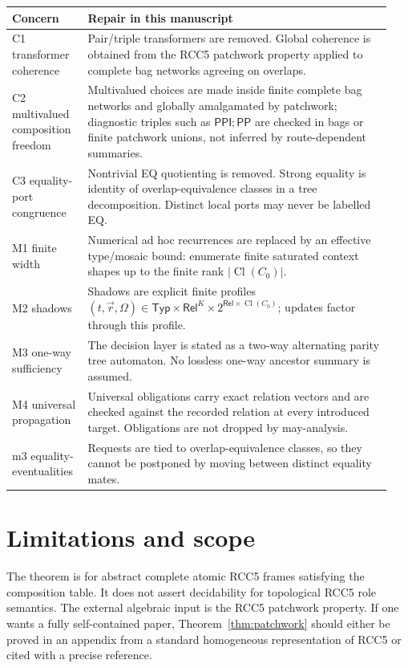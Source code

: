 \documentclass[11pt]{article}
\newcommand{\Rel}{\mathsf{Rel}}
\newcommand{\PP}{\mathsf{PP}}
\newcommand{\PPI}{\mathsf{PPI}}
\newcommand{\Cl}{\operatorname{Cl}}
\begin{document}
\begin{longtable}{p{0.18\linewidth}p{0.76\linewidth}}
\toprule
Concern & Repair in this manuscript\\
\midrule
C1 transformer coherence & Pair/triple transformers are removed.  Global coherence is
obtained from the RCC5 patchwork property applied to complete bag networks agreeing on
overlaps.\\
C2 multivalued composition freedom & Multivalued choices are made inside finite complete
bag networks and globally amalgamated by patchwork; diagnostic triples such as
$\PPI;\PP$ are checked in bags or finite patchwork unions, not inferred by route-dependent
summaries.\\
C3 equality-port congruence & Nontrivial EQ quotienting is removed.  Strong equality is
identity of overlap-equivalence classes in a tree decomposition.  Distinct local ports
may never be labelled EQ.\\
M1 finite width & Numerical ad hoc recurrences are replaced by an effective type/mosaic
bound: enumerate finite saturated context shapes up to the finite rank $|\Cl(C_0)|$.\\
M2 shadows & Shadows are explicit finite profiles
$(t,\vec r,\Omega)\in\mathsf{Typ}\times\Rel^K\times2^{\Rel\times\Cl(C_0)}$; updates factor
through this profile.\\
M3 one-way sufficiency & The decision layer is stated as a two-way alternating parity
tree automaton.  No lossless one-way ancestor summary is assumed.\\
M4 universal propagation & Universal obligations carry exact relation vectors and are
checked against the recorded relation at every introduced target.  Obligations are not
dropped by may-analysis.\\
m3 equality-eventualities & Requests are tied to overlap-equivalence classes, so they
cannot be postponed by moving between distinct equality mates.\\
\bottomrule
\end{longtable}

\section{Limitations and scope}

The theorem is for abstract complete atomic RCC5 frames satisfying the composition table.
It does not assert decidability for topological RCC5 role semantics.  The external
algebraic input is the RCC5 patchwork property.  If one wants a fully self-contained
paper, Theorem~\ref{thm:patchwork} should either be proved in an appendix from a standard
homogeneous representation of RCC5 or cited with a precise reference.
\end{document}
